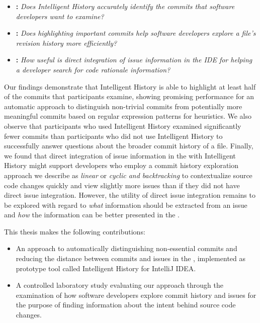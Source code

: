 \begin{itemize}[leftmargin=*]
    \item[] \textbf{:} \textit{Does Intelligent History accurately identify the commits that software developers want to examine?}
    \item[] \textbf{:} \textit{Does highlighting important commits help software developers explore a file’s revision history more efficiently?}
    \item[] \textbf{:} \textit{How useful is direct integration of issue information in the IDE for helping a developer search for code rationale information?}
\end{itemize}

Our findings demonstrate that Intelligent History is able to highlight at least half of
the commits that participants examine, showing promising performance for
an automatic approach to distinguish non-trivial commits from potentially
more meaningful commits based on regular expression patterns for heuristics.
We also observe that participants who used Intelligent History examined significantly
fewer commits than participants who did not use Intelligent History to successfully answer
questions about the broader commit history of a file.
Finally, we found that direct integration of issue information in the 
with Intelligent History might support developers who employ a commit history exploration approach
we describe as \textit{linear} or \textit{cyclic and backtracking} to contextualize
source code changes quickly and view slightly more issues than if they did not have
direct issue integration. 
However, the utility of direct issue integration remains to be explored with
regard to \emph{what} information should be extracted from an issue
and \emph{how} the information can be better presented in the .

This thesis makes the following contributions:
\begin{itemize}
	\item An approach to automatically distinguishing non-essential commits and reducing the distance between commits and issues in the , 
		implemented as prototype tool called Intelligent History for IntelliJ IDEA.
	\item A controlled laboratory study evaluating our approach through the examination of how software developers explore commit history and issues
		for the purpose of finding information about the intent behind source code changes.
\end{itemize}

